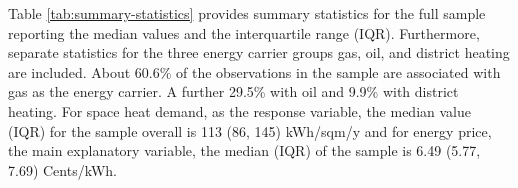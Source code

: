 \documentclass[12pt,twoside]{reedthesis}
\begin{document}
Table \ref{tab:summary-statistics} provides summary statistics for the full sample reporting the median values and the interquartile range (IQR). Furthermore, separate statistics for the three energy carrier groups gas, oil, and district heating are included. About 60.6\% of the observations in the sample are associated with gas as the energy carrier. A further 29.5\% with oil and 9.9\% with district heating. For space heat demand, as the response variable, the median value (IQR) for the sample overall is 113 (86, 145) kWh/sqm/y and for energy price, the main explanatory variable, the median (IQR) of the sample is 6.49 (5.77, 7.69) Cents/kWh.
\begin{table}[]
\centering
\caption{Summary statistics}
\label{tab:summary-statistics}
\end{table}
\end{document}
